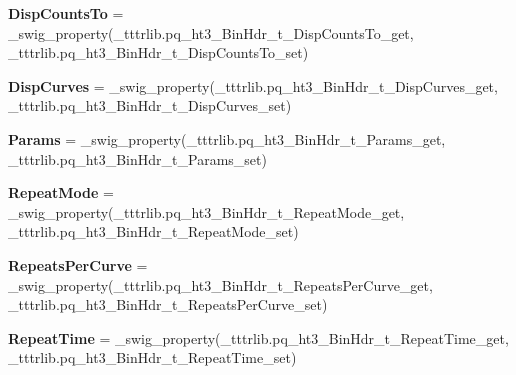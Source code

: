 \begin{DoxyCompactItemize}
\item 
\mbox{\label{classtttrlib_1_1pq__ht3___bin_hdr__t_a2ecc0e877521353187965131929ace74}} 
{\bfseries Disp\+Counts\+To} = \+\_\+swig\+\_\+property(\+\_\+tttrlib.\+pq\+\_\+ht3\+\_\+\+Bin\+Hdr\+\_\+t\+\_\+\+Disp\+Counts\+To\+\_\+get, \+\_\+tttrlib.\+pq\+\_\+ht3\+\_\+\+Bin\+Hdr\+\_\+t\+\_\+\+Disp\+Counts\+To\+\_\+set)
\item 
\mbox{\label{classtttrlib_1_1pq__ht3___bin_hdr__t_aad2071b8fc88b2dddaad6356c4d1bb7b}} 
{\bfseries Disp\+Curves} = \+\_\+swig\+\_\+property(\+\_\+tttrlib.\+pq\+\_\+ht3\+\_\+\+Bin\+Hdr\+\_\+t\+\_\+\+Disp\+Curves\+\_\+get, \+\_\+tttrlib.\+pq\+\_\+ht3\+\_\+\+Bin\+Hdr\+\_\+t\+\_\+\+Disp\+Curves\+\_\+set)
\item 
\mbox{\label{classtttrlib_1_1pq__ht3___bin_hdr__t_a55ea39dd1bb20f1896f22ab84a3a04c1}} 
{\bfseries Params} = \+\_\+swig\+\_\+property(\+\_\+tttrlib.\+pq\+\_\+ht3\+\_\+\+Bin\+Hdr\+\_\+t\+\_\+\+Params\+\_\+get, \+\_\+tttrlib.\+pq\+\_\+ht3\+\_\+\+Bin\+Hdr\+\_\+t\+\_\+\+Params\+\_\+set)
\item 
\mbox{\label{classtttrlib_1_1pq__ht3___bin_hdr__t_a588b1ce97491bdf5f951a9fbd5537f8b}} 
{\bfseries Repeat\+Mode} = \+\_\+swig\+\_\+property(\+\_\+tttrlib.\+pq\+\_\+ht3\+\_\+\+Bin\+Hdr\+\_\+t\+\_\+\+Repeat\+Mode\+\_\+get, \+\_\+tttrlib.\+pq\+\_\+ht3\+\_\+\+Bin\+Hdr\+\_\+t\+\_\+\+Repeat\+Mode\+\_\+set)
\item 
\mbox{\label{classtttrlib_1_1pq__ht3___bin_hdr__t_a78036ec6ee14bbc70297ef5ee73901c7}} 
{\bfseries Repeats\+Per\+Curve} = \+\_\+swig\+\_\+property(\+\_\+tttrlib.\+pq\+\_\+ht3\+\_\+\+Bin\+Hdr\+\_\+t\+\_\+\+Repeats\+Per\+Curve\+\_\+get, \+\_\+tttrlib.\+pq\+\_\+ht3\+\_\+\+Bin\+Hdr\+\_\+t\+\_\+\+Repeats\+Per\+Curve\+\_\+set)
\item 
\mbox{\label{classtttrlib_1_1pq__ht3___bin_hdr__t_a0047856f70679fea7db85518aeb98b04}} 
{\bfseries Repeat\+Time} = \+\_\+swig\+\_\+property(\+\_\+tttrlib.\+pq\+\_\+ht3\+\_\+\+Bin\+Hdr\+\_\+t\+\_\+\+Repeat\+Time\+\_\+get, \+\_\+tttrlib.\+pq\+\_\+ht3\+\_\+\+Bin\+Hdr\+\_\+t\+\_\+\+Repeat\+Time\+\_\+set)

\end{DoxyCompactItemize}

